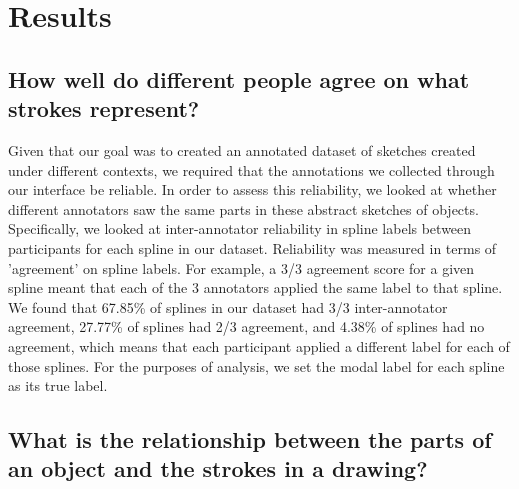 \documentclass[10pt,letterpaper]{article}
\begin{document}

\section{Results}

\subsection{How well do different people agree on what strokes represent?}

Given that our goal was to created an annotated dataset of sketches created under different contexts, we required that the annotations we collected through our interface be reliable. 
In order to assess this reliability, we looked at whether different annotators saw the same parts in these abstract sketches of objects. 
Specifically, we looked at inter-annotator reliability in spline labels between participants for each spline in our dataset. 
Reliability was measured in terms of 'agreement' on spline labels. 
For example, a 3/3 agreement score for a given spline meant that each of the 3 annotators applied the same label to that spline. 
We found that 67.85\% of splines in our dataset had 3/3 inter-annotator agreement, 27.77\% of splines had 2/3 agreement, and 4.38\% of splines had no agreement, which means that each participant applied a different label for each of those splines.
For the purposes of analysis, we set the modal label for each spline as its true label.

\subsection{What is the relationship between the parts of an object and the strokes in a drawing?}
\end{document}
